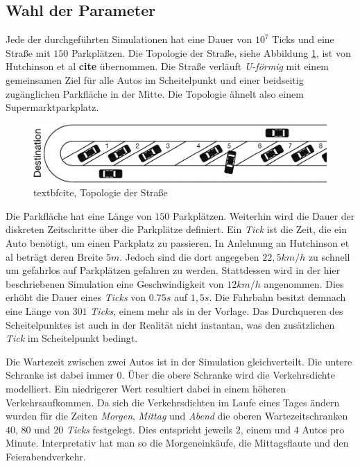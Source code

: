 \subsection{Wahl der Parameter}
Jede der durchgeführten Simulationen hat eine Dauer von $10^7$ Ticks und eine Straße mit $150$ Parkplätzen. Die Topologie der Straße, siehe Abbildung \ref{fig_street}, ist von Hutchinson et al \textbf{cite} übernommen. Die Straße verläuft \emph{U-förmig} mit einem gemeinsamen Ziel für alle Autos im Scheitelpunkt und einer beidseitig zugänglichen Parkfläche in der Mitte. Die Topologie ähnelt also einem Supermarktparkplatz. 
\begin{figure}
\includegraphics[width=\textwidth]{pics/street.png}
\caption{textbf{cite}, Topologie der Straße}\label{fig_street}
\end{figure}
 Die Parkfläche hat eine Länge von $150$ Parkplätzen. Weiterhin wird die Dauer der diskreten Zeitschritte über die Parkplätze definiert. Ein \emph{Tick} ist die Zeit, die ein Auto benötigt, um einen Parkplatz zu passieren. 
In Anlehnung an Hutchinson et al beträgt deren Breite $5m$. Jedoch sind die dort angegeben $22,5 km/h$ zu schnell um gefahrlos auf Parkplätzen gefahren zu werden. Stattdessen wird in der hier beschriebenen Simulation eine Geschwindigkeit von $12km/h$ angenommen. Dies erhöht die Dauer eines \emph{Ticks} von $0.75s$ auf $1,5s$. Die Fahrbahn besitzt demnach eine Länge von $301$ \emph{Ticks}, einem mehr als in der Vorlage. Das Durchqueren des Scheitelpunktes ist auch in der Realität nicht instantan, was den zusätzlichen \emph{Tick} im Scheitelpunkt bedingt. 

Die Wartezeit zwischen zwei Autos ist in der Simulation gleichverteilt. Die untere Schranke ist dabei immer $0$. Über die obere Schranke wird die Verkehrsdichte modelliert. Ein niedrigerer Wert resultiert dabei in einem höheren Verkehrsaufkommen. Da sich die Verkehrsdichten im Laufe eines Tages ändern wurden für die Zeiten \emph{Morgen}, \emph{Mittag} und \emph{Abend} die oberen Wartezeitschranken $40$, $80$ und $20$ \emph{Ticks} festgelegt. Dies entspricht jeweils $2$, einem und $4$ Autos pro Minute. Interpretativ hat man so die Morgeneinkäufe, die Mittagsflaute und den Feierabendverkehr. 

